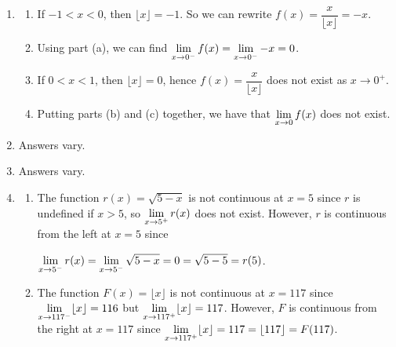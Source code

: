 \documentclass{ximera}
\begin{document}
\begin{enumerate}
\setcounter{enumi}{\value{HW}}

\item   \begin{enumerate}

\item  If $-1 < x < 0$, then $\lfloor x \rfloor = -1$. So we can rewrite $f(x) = \dfrac{x}{\lfloor x \rfloor} = -x$.

\smallskip

\item  Using part (a), we can find  $\ds{ \lim_{x \rightarrow 0^{-}} f(x) =  \lim_{x \rightarrow 0^{-}} -x = 0}$.

\smallskip

\item  If $0 < x < 1$, then $\lfloor x \rfloor =0$, hence $f(x) = \dfrac{x}{\lfloor x \rfloor}$ does not exist as $x \rightarrow 0^{+}$.

\smallskip

\item  Putting parts (b) and (c) together, we have that   $\ds{ \lim_{x \rightarrow 0} f(x)}$   does not exist.

\smallskip

\end{enumerate}

\item Answers vary.

\item  Answers vary.

\item \begin{enumerate} \item    The function $r(x) = \sqrt{5-x}$ is not continuous at $x = 5$ since $r$ is undefined if $x>5$, so $\ds{\lim_{x \rightarrow 5^{+}} r(x)}$ does not exist. However, $r$ is continuous from the left at $x = 5$ since 

$\ds{\lim_{x \rightarrow 5^{-}} r(x) =  \lim_{x \rightarrow 5^{-}} \sqrt{5-x} = 0 = \sqrt{5-5} = r(5)}$.

\smallskip

\item  The function  $F(x) = \lfloor x \rfloor$ is not continuous at $x = 117$ since $\ds{\lim_{x \rightarrow 117^{-}} \lfloor x \rfloor = 116}$ but $\ds{\lim_{x \rightarrow 117^{+}} \lfloor x \rfloor = 117}$.  However, $F$ is continuous from the right at $x = 117$ since $\ds{\lim_{x \rightarrow 117^{+}} \lfloor x \rfloor = 117 = \lfloor 117 \rfloor = F(117)}$. 


\end{enumerate}
\end{enumerate}
\end{document}

